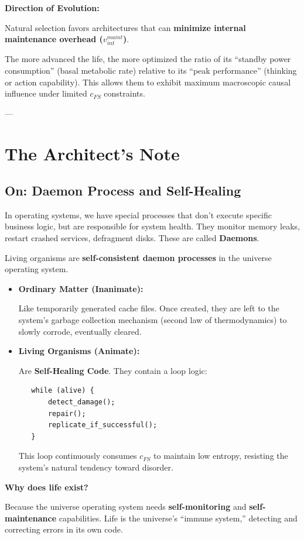 \textbf{Direction of Evolution:}

Natural selection favors architectures that can \textbf{minimize internal maintenance overhead ($v_{int}^{maint}$)}.

The more advanced the life, the more optimized the ratio of its ``standby power consumption'' (basal metabolic rate) relative to its ``peak performance'' (thinking or action capability). This allows them to exhibit maximum macroscopic causal influence under limited $c_{FS}$ constraints.

---

\section{The Architect's Note}

\subsection{On: Daemon Process and Self-Healing}

In operating systems, we have special processes that don't execute specific business logic, but are responsible for system health. They monitor memory leaks, restart crashed services, defragment disks. These are called \textbf{Daemons}.

Living organisms are \textbf{self-consistent daemon processes} in the universe operating system.

\begin{itemize}
\item \textbf{Ordinary Matter (Inanimate):}

   Like temporarily generated cache files. Once created, they are left to the system's garbage collection mechanism (second law of thermodynamics) to slowly corrode, eventually cleared.

\item \textbf{Living Organisms (Animate):}

   Are \textbf{Self-Healing Code}. They contain a loop logic:

   \begin{verbatim}
   while (alive) {
       detect_damage();
       repair();
       replicate_if_successful();
   }
   \end{verbatim}

   This loop continuously consumes $c_{FS}$ to maintain low entropy, resisting the system's natural tendency toward disorder.
\end{itemize}

\textbf{Why does life exist?}

Because the universe operating system needs \textbf{self-monitoring} and \textbf{self-maintenance} capabilities. Life is the universe's ``immune system,'' detecting and correcting errors in its own code.

